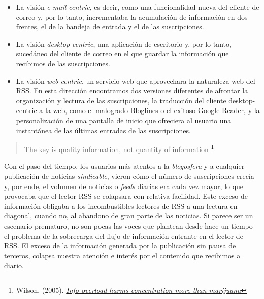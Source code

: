 \documentclass[12pt, a4paper,twoside]{book}
\begin{document}
\begin{itemize}
\item
  La visión \emph{e-mail-centric}, es decir, como una funcionalidad
  nueva del cliente de correo y, por lo tanto, incrementaba la
  acumulación de información en dos frentes, el de la bandeja de
  entrada y el de las suscripciones.
\item
  La visión \emph{desktop-centric}, una aplicación de escritorio y,
  por lo tanto, sucedáneo del cliente de correo en el que guardar la
  información que recibimos de las suscripciones.
\item
  La visión \emph{web-centric}, un servicio web que aprovechara la
  naturaleza web del RSS. En esta dirección encontramos dos versiones
  diferentes de afrontar la organización y lectura de las
  suscripciones, la traducción del cliente desktop-centric a la web,
  como el malogrado Bloglines o el exitoso Google Reader, y la
  personalización de una pantalla de inicio que ofreciera al usuario
  una instantánea de las últimas entradas de las suscripciones.
\end{itemize}
\begin{quote}
The key is quality information, not quantity of information%
\footnote{Wilson, (2005).
\emph{\href{http://www.newscientist.com/article/mg18624973.400}{Info-overload harms concentration more than marijuana}}}

\end{quote}
Con el paso del tiempo, los usuarios más atentos a la
\emph{blogosfera} y a cualquier publicación de noticias
\emph{sindicable}, vieron cómo el número de suscripciones crecía y,
por ende, el volumen de noticias o \emph{feeds} diarias era cada
vez mayor, lo que provocaba que el lector RSS se colapsara con
relativa facilidad. Este exceso de información obligaba a los
incombustibles lectores de RSS a una lectura en diagonal, cuando
no, al abandono de gran parte de las noticias. Si parece ser un
escenario prematuro, no son pocas las voces que plantean desde hace
un tiempo el problema de la sobrecarga del flujo de información
entrante en el lector de RSS. El exceso de la información generada
por la publicación sin pausa de terceros, colapsa nuestra atención
e interés por el contenido que recibimos a diario.
\end{document}
